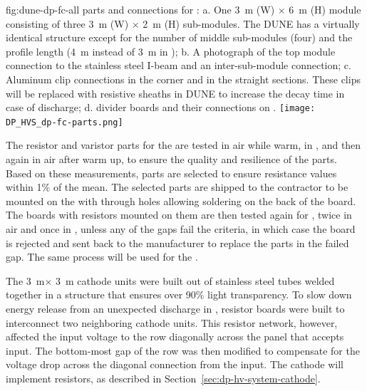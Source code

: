 \begin{dunefigure}{fig:dune-dp-fc-all}
{ parts and connections for :  a. One \SI{3}{\m} (W) $\times$ \SI{6}{\m} (H)   module consisting of three \SI{3}{\m} (W) $\times$ \SI{2}{\m} (H) sub-modules.  The DUNE  has a virtually identical structure except for the number of middle sub-modules (four) and the profile length (\SI{4}{\m} instead of \SI{3}{\m} in ); b. A photograph of the top module connection to the stainless steel I-beam and an inter-sub-module connection; c. Aluminum clip connections in the corner and in the straight sections.  These clips will be replaced with resistive sheaths in DUNE  to increase the decay time in case of discharge; d.  divider boards and their connections on  .}
\texttt{[image: DP\_HVS\_dp-fc-parts.png]}
\end{dunefigure}

The resistor and varistor parts for the  are tested in air while warm, in \lntwo, and then again in air after warm up, to ensure the quality and resilience of the parts.  
Based on these measurements, parts are selected to ensure resistance values within \num{1}\% of the mean. 
The selected parts are shipped to the contractor to be mounted on the  with through holes allowing soldering on the back of the board.
The boards with resistors mounted on them are then tested again for , twice in air and once in \lntwo, unless any of the gaps fail the  criteria, in which case the board is rejected and sent back to the manufacturer to replace the parts in the failed gap.
The same  process will be used for the .

The  \SI{3}{\m}$\times$ \SI{3}{\m} cathode units were built out of stainless steel tubes welded together in a structure that ensures over \num{90}\% light transparency.
To slow down energy release from an unexpected discharge in , resistor boards were built to interconnect two neighboring cathode units. 
This resistor network, however, affected the input voltage to the  row diagonally across the  panel that accepts  input. The bottom-most gap of the  row was then modified to compensate for the voltage drop across the diagonal connection from the  input. 
The  cathode will implement resistors, as described in Section~\ref{sec:dp-hv-system-cathode}.

